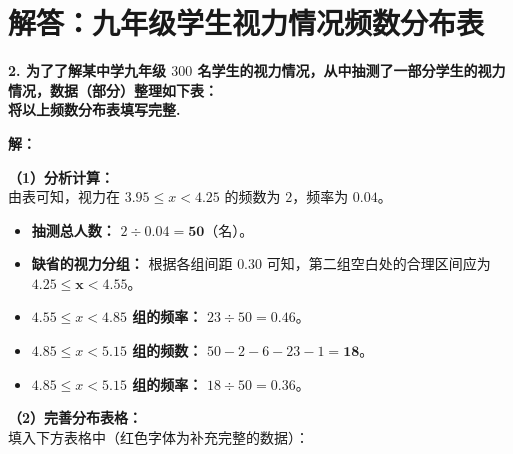 \newpage



\newpage

\section{解答：九年级学生视力情况频数分布表}

\vspace{0.6cm}

\textbf{2. 为了了解某中学九年级 $300$ 名学生的视力情况，从中抽测了一部分学生的视力情况，数据（部分）整理如下表：}\\
\textbf{将以上频数分布表填写完整.}

\vspace{0.4cm}

\textbf{解：}

\textbf{（1）分析计算：} \\
由表可知，视力在 $3.95 \leqslant x < 4.25$ 的频数为 $2$，频率为 $0.04$。
\begin{itemize}
  \item \textbf{抽测总人数：} $2 \div 0.04 = \boldsymbol{50}$（名）。
  \item \textbf{缺省的视力分组：} 根据各组间距 $0.30$ 可知，第二组空白处的合理区间应为 $\boldsymbol{4.25 \leqslant x < 4.55}$。
  \item \textbf{$4.55 \leqslant x < 4.85$ 组的频率：} $23 \div 50 = \boldsymbol{0.46}$。
  \item \textbf{$4.85 \leqslant x < 5.15$ 组的频数：} $50 - 2 - 6 - 23 - 1 = \boldsymbol{18}$。
  \item \textbf{$4.85 \leqslant x < 5.15$ 组的频率：} $18 \div 50 = \boldsymbol{0.36}$。
\end{itemize}

\textbf{（2）完善分布表格：} \\
填入下方表格中（红色字体为补充完整的数据）：


